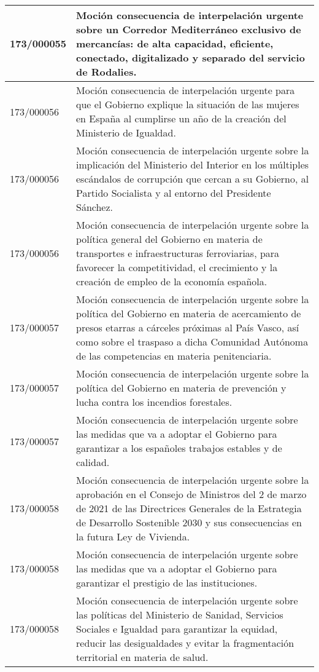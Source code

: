 {\begin{table}[H]
\begin{center}
\begin{tabularx}{\linewidth}{| l | X |}
\hline
173/000055 & Moción consecuencia de interpelación urgente sobre un Corredor Mediterráneo exclusivo de mercancías: de alta capacidad, eficiente, conectado, digitalizado y separado del servicio de Rodalies. \\
\hline
173/000056 & Moción consecuencia de interpelación urgente para que el Gobierno explique la situación de las mujeres en España al cumplirse un año de la creación del Ministerio de Igualdad. \\
\hline
173/000056 & Moción consecuencia de interpelación urgente sobre la implicación del Ministerio del Interior en los múltiples escándalos de corrupción que cercan a su Gobierno, al Partido Socialista y al entorno del Presidente Sánchez. \\
\hline
173/000056 & Moción consecuencia de interpelación urgente sobre la política general del Gobierno en materia de transportes e infraestructuras ferroviarias, para favorecer la competitividad, el crecimiento y la creación de empleo de la economía española. \\
\hline
173/000057 & Moción consecuencia de interpelación urgente sobre la política del Gobierno en materia de acercamiento de presos etarras a cárceles próximas al País Vasco, así como sobre el traspaso a dicha Comunidad Autónoma de las competencias en materia penitenciaria. \\
\hline
173/000057 & Moción consecuencia de interpelación urgente sobre la política del Gobierno en materia de prevención y lucha contra los incendios forestales. \\
\hline
173/000057 & Moción consecuencia de interpelación urgente sobre las medidas que va a adoptar el Gobierno para garantizar a los españoles trabajos estables y de calidad. \\
\hline
173/000058 & Moción consecuencia de interpelación urgente sobre la aprobación en el Consejo de Ministros del 2 de marzo de 2021 de las Directrices Generales de la Estrategia de Desarrollo Sostenible 2030 y sus consecuencias en la futura Ley de Vivienda. \\
\hline
173/000058 & Moción consecuencia de interpelación urgente sobre las medidas que va a adoptar el Gobierno para garantizar el prestigio de las instituciones. \\
\hline
173/000058 & Moción consecuencia de interpelación urgente sobre las políticas del Ministerio de Sanidad, Servicios Sociales e Igualdad para garantizar la equidad, reducir las desigualdades y evitar la fragmentación territorial en materia de salud. \\

\end{tabularx}
\end{center}
\end{table}}

